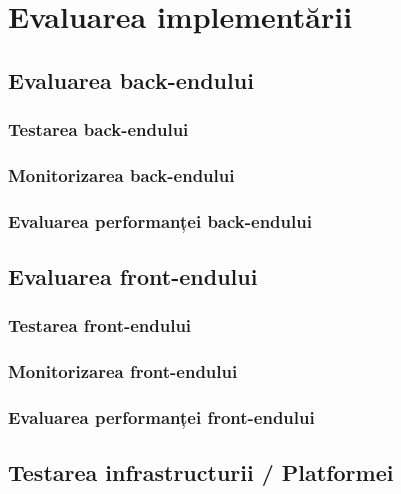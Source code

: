 \chapter{Evaluarea implementării}
\label{chapter:evaluare}

\section{Evaluarea back-endului}
\label{subsec:evaluare-backend}

\subsection{Testarea back-endului}
\label{subsubsec:evaluare-backend-testare}

\subsection{Monitorizarea back-endului}
\label{subsubsec:evaluare-backend-monitorizare}

\subsection{Evaluarea performanței back-endului}
\label{subsubsec:evaluare-backend-performanta}

\section{Evaluarea front-endului}
\label{subsec:evaluare-frontend}

\subsection{Testarea front-endului}
\label{subsubsec:evaluare-frontend-testare}

\subsection{Monitorizarea front-endului}
\label{subsubsec:evaluare-frontend-monitorizare}

\subsection{Evaluarea performanței front-endului}
\label{subsubsec:evaluare-frontend-performanta}

\section{Testarea infrastructurii / Platformei}
\label{subsec:evaluare-infrastructura}

